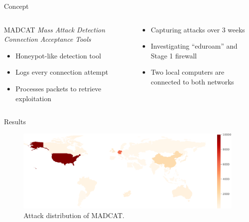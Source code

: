 \begin{frame}{Concept}
    \begin{columns}[T]
        \begin{column}{0.5\textwidth}
            \begin{block}{MADCAT}
                \textit{Mass Attack Detection Connection Acceptance Tools}
            \end{block}
            {\footnotesize
            \begin{itemize}
                \item Honeypot-like detection tool
                \item Logs every connection attempt
                \item Processes packets to retrieve exploitation
            \end{itemize}
            }
        \end{column}
        \begin{column}{0.6\textwidth}
            \begin{itemize}
                \item Capturing attacks over 3 weeks
                \item Investigating \enquote{eduroam} and Stage 1 firewall
                \item Two local computers are connected to both networks
            \end{itemize}
        \end{column}
    \end{columns}
\end{frame}

\begin{frame}{Results}
    \begin{figure}
        \centering
        \includegraphics[width=\textwidth]{img/madcat-overview-map.pdf}
        \caption[Attack distribution of MADCAT]{
            Attack distribution of MADCAT.
        }
        \label{fig:madcat-attack-distribution}
    \end{figure}
\end{frame}


